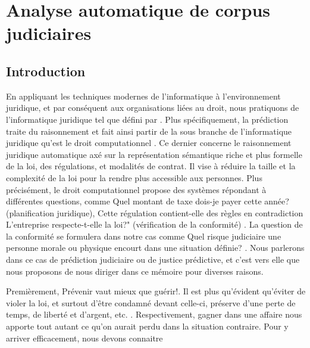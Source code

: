 \chapter{Analyse automatique de corpus judiciaires}
\label{chap:literature}



\section{Introduction}
En appliquant les techniques modernes de l'informatique à l'environnement juridique, et par conséquent aux organisations liées au droit, nous pratiquons de l'\og informatique juridique \fg{} tel que défini par \citet{erdelez1997legalinformatics}. Plus spécifiquement, la prédiction traite du raisonnement et fait ainsi partir de la sous branche de  l'\og informatique juridique \fg{} qu'est le \og droit computationnel \fg{}. Ce dernier concerne le raisonnement juridique automatique  axé sur la représentation sémantique riche et plus formelle de la loi, des régulations, et modalités de contrat. Il vise à réduire la taille et la complexité de la loi pour la rendre plus accessible aux personnes. Plus précisément, le \og droit computationnel \fg{} propose des systèmes répondant à différentes questions, comme \og Quel montant de taxe dois-je payer cette année? \fg{} (planification juridique), \og Cette régulation contient-elle des règles en contradiction\fg{} \og L'entreprise respecte-t-elle la loi?" (vérification de la conformité) \citep{Genesereth2015computationallaw}. La question de la conformité se formulera dans notre cas comme \og Quel risque judiciaire une personne morale ou physique encourt dans une situation définie? \fg{}. Nous parlerons dans ce cas de prédiction judiciaire ou de justice prédictive, et c'est vers elle que nous proposons de nous diriger dans ce mémoire pour diverses raisons.

Premièrement, \og Prévenir vaut mieux que guérir!\fg{}. Il est plus qu'évident qu'éviter de violer la loi, et surtout d'être condamné devant celle-ci, préserve d'une perte de temps, de liberté et d'argent, etc. . Respectivement, \og gagner dans une affaire \fg{} nous apporte tout autant ce qu'on aurait perdu dans la situation contraire.   Pour y arriver efficacement, nous devons connaitre 


